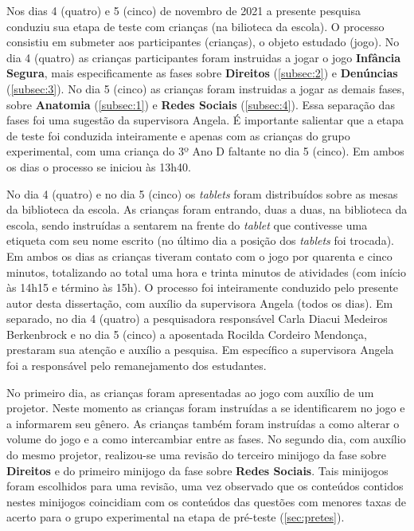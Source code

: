 Nos dias 4 (quatro) e 5 (cinco) de novembro de 2021 a presente pesquisa conduziu sua etapa de teste com crianças (na bilioteca da escola). O processo consistiu em submeter aos participantes (crianças), o objeto estudado (jogo). No dia 4 (quatro) as crianças participantes foram instruidas a jogar o jogo \textbf{Infância Segura}, mais especificamente as fases sobre \textbf{Direitos} (\autoref{subsec:2}) e \textbf{Denúncias} (\autoref{subsec:3}). No dia 5 (cinco) as crianças foram instruidas a jogar as demais fases, sobre \textbf{Anatomia} (\autoref{subsec:1}) e \textbf{Redes Sociais} (\autoref{subsec:4}). Essa separação das fases foi uma sugestão da supervisora Angela. É importante salientar que a etapa de teste foi conduzida inteiramente e apenas com as crianças do grupo experimental, com uma criança do 3º Ano D faltante no dia 5 (cinco). Em ambos os dias o processo se iniciou às 13h40.

No dia 4 (quatro) e no dia 5 (cinco) os \textit{tablets} foram distribuídos sobre as mesas da biblioteca da escola. As crianças foram entrando, duas a duas, na biblioteca da escola, sendo instruídas a sentarem na frente do \textit{tablet} que contivesse uma etiqueta com seu nome escrito (no último dia a posição dos \textit{tablets} foi trocada). Em ambos os dias as crianças tiveram contato com o jogo por quarenta e cinco minutos, totalizando ao total uma hora e trinta minutos de atividades (com início às 14h15 e término às 15h). O processo foi inteiramente conduzido pelo presente autor desta dissertação, com auxílio da supervisora Angela (todos os dias). Em separado, no dia 4 (quatro) a pesquisadora responsável Carla Diacui Medeiros Berkenbrock e no dia 5 (cinco) a aposentada Rocilda Cordeiro Mendonça, prestaram sua atenção e auxílio a pesquisa. Em específico a supervisora Angela foi a responsável pelo remanejamento dos estudantes. %

No primeiro dia, as crianças foram apresentadas ao jogo com auxílio de um projetor. Neste momento as crianças foram instruídas a se identificarem no jogo e a informarem seu gênero. As crianças também foram instruídas a como alterar o volume do jogo e a como intercambiar entre as fases. No segundo dia, com auxílio do mesmo projetor, realizou-se uma revisão do terceiro minijogo da fase sobre \textbf{Direitos} e do primeiro minijogo da fase sobre \textbf{Redes Sociais}. Tais minijogos foram escolhidos para uma revisão, uma vez observado que os conteúdos contidos nestes minijogos coincidiam com os conteúdos das questões com menores taxas de acerto para o grupo experimental na etapa de pré-teste (\autoref{sec:pretes}).

